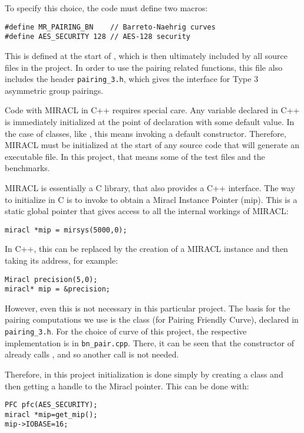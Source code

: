 \documentclass{article}
\begin{document}
To specify this choice, the code must define two macros:
\begin{verbatim}
#define MR_PAIRING_BN    // Barreto-Naehrig curves
#define AES_SECURITY 128 // AES-128 security
\end{verbatim}

This is defined at the start of \fhutils, which is then ultimately included by all source files in the project.
In order to use the pairing related functions, this file also includes the header \verb|pairing_3.h|, which gives the interface for Type 3 asymmetric group pairings.

Code with MIRACL in C++ requires special care. Any variable declared in C++ is immediately initialized at the point of declaration with some default value. In the case of classes, like \cBig, this means invoking a default constructor. Therefore, MIRACL must be initialized at the start of any source code that will generate an executable file. In this project, that means some of the test files and the benchmarks.

MIRACL is essentially a C library, that also provides a C++ interface. The way to initialize in C is to invoke  to obtain a Miracl Instance Pointer (mip). This is a static global pointer that gives access to all the internal workings of MIRACL:
\begin{verbatim}
miracl *mip = mirsys(5000,0);
\end{verbatim}

In C++, this can be replaced by the creation of a MIRACL instance and then taking its address, for example:
\begin{verbatim}
Miracl precision(5,0); 
miracl* mip = &precision;
\end{verbatim}

However, even this is not necessary in this particular project. The basis for the pairing computations we use is the class \cPFC (for Pairing Friendly Curve), declared in \verb|pairing_3.h|. For the choice of curve of this project, the respective implementation is in \verb|bn_pair.cpp|. There, it can be seen that the constructor of \cPFC already calls , and so another call is not needed. 

Therefore, in this project initialization is done simply by creating a \cPFC class and then getting a handle to the Miracl pointer. This can be done with:
\begin{verbatim}
PFC pfc(AES_SECURITY);  
miracl *mip=get_mip();  
mip->IOBASE=16;
\end{verbatim}
\end{document}
